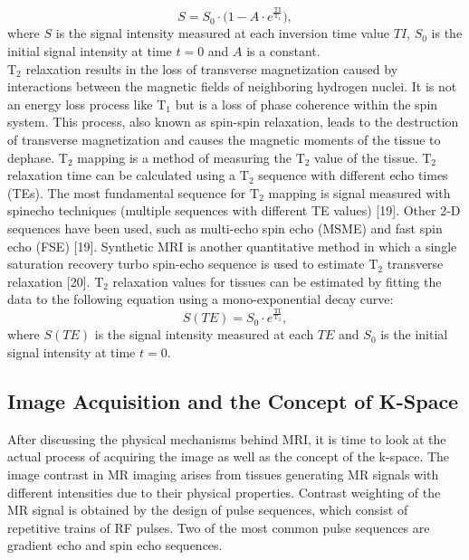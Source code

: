 \documentclass[english,version-2022-01]{uzl-thesis} %
\begin{document}
\begin{equation}
	S = S_0 \cdot \bigg(1 - A \cdot e^{\frac{\text{TI}}{\text{T}_1}} \bigg),
\end{equation}
where $S$ is the signal intensity measured at each inversion time value $TI$, $S_0$ is the initial signal intensity at time $t=0$ and $A$ is
a constant.\\
$\text{T}_2$ relaxation results in the loss of transverse magnetization caused by interactions between the magnetic fields of neighboring hydrogen nuclei. It is not an energy loss process like $\text{T}_1$ but is a loss of phase coherence within the spin system. This process, also known as spin-spin relaxation, leads to the destruction of transverse magnetization and causes the magnetic moments of the tissue to dephase. $\text{T}_2$ mapping is a method of measuring the $\text{T}_2$ value of the tissue. $\text{T}_2$ relaxation time can be calculated using a $\text{T}_2$ sequence with different echo times (TEs). The most fundamental sequence for $\text{T}_2$ mapping is signal measured with spinecho techniques (multiple sequences with different TE values) [19]. Other 2-D sequences have been used, such as multi-echo spin echo (MSME) and fast spin echo (FSE) [19]. Synthetic MRI is another quantitative method in which a single saturation recovery turbo spin-echo sequence is used to estimate $\text{T}_2$ transverse relaxation [20]. $\text{T}_2$ relaxation values for tissues can be estimated by fitting the data to the following equation using a mono-exponential decay curve:
\begin{equation}
	S(TE) = S_0 \cdot e^{\frac{\text{TI}}{\text{T}_2}},
\end{equation}
where $S(TE)$ is the signal intensity measured at each $TE$ and
$S_0$ is the initial signal intensity at time $t=0$.

\subsection{Image Acquisition and the Concept of K-Space} \label{SubSec:ImageAcquisitionAndK-Space}
After discussing the physical mechanisms behind MRI, it is time to look at the actual process of acquiring the image as well as the concept of the k-space. 
The image contrast in MR imaging arises from tissues generating MR signals with different intensities due to their physical properties. Contrast weighting of the MR signal is obtained by the design of pulse sequences, which consist of repetitive trains of RF pulses. Two of the most common pulse sequences are gradient echo 
and spin echo 
sequences. %
\end{document}
